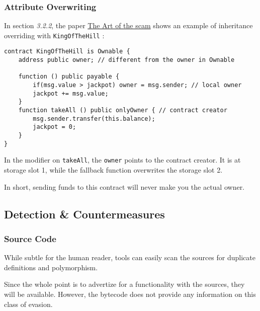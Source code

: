 \subsubsection{Attribute Overwriting}

In section \emph{3.2.2}, the paper \href{\urlpaperartofthescam}{The Art of the scam} shows an example of inheritance overriding with \lstinline{KingOfTheHill} :

\begin{lstlisting}[language=Solidity]
contract KingOfTheHill is Ownable {
    address public owner; // different from the owner in Ownable

    function () public payable {
        if(msg.value > jackpot) owner = msg.sender; // local owner
        jackpot += msg.value;
    }
    function takeAll () public onlyOwner { // contract creator
        msg.sender.transfer(this.balance);
        jackpot = 0;
    }
}
\end{lstlisting}

In the modifier on \lstinline{takeAll}, the \lstinline{owner} points to the contract creator.
It is at storage slot 1, while the fallback function overwrites the storage slot 2.

In short, sending funds to this contract will never make you the actual owner.

\subsection{Detection \& Countermeasures}

\subsubsection{Source Code}

While subtle for the human reader, tools can easily scan the sources for duplicate definitions and polymorphism.

Since the whole point is to advertize for a functionality with the sources, they will be available.
However, the bytecode does not provide any information on this class of evasion.

